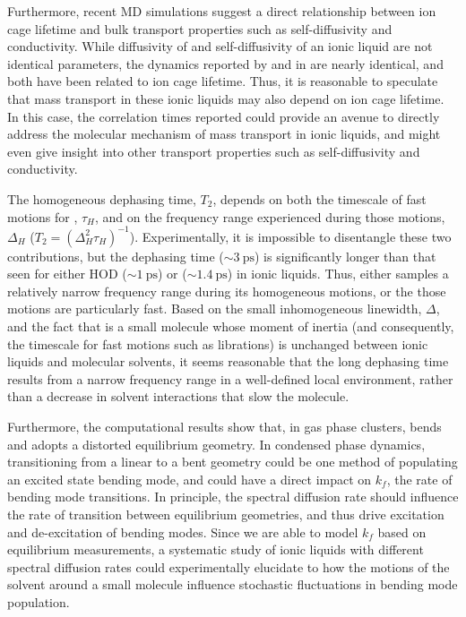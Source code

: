 \documentclass[%
  class = book,%
  crop = false,%
  float = true,%
  multi = true,%
  preview = false,%
]{standalone}
\let\cite\autocite
\begin{document}
{Furthermore, recent MD simulations suggest a direct relationship between ion cage lifetime and bulk transport properties such as self-diffusivity and conductivity.\cite{Zhang2015b} While diffusivity of  and self-diffusivity of an ionic liquid are not identical parameters, the dynamics reported by  and \ce{[SCN]-}\cite{Ren2014} in \ce{[Im_{4,1}][Tf2N]} are nearly identical, and both have been related to ion cage lifetime. Thus, it is reasonable to speculate that  mass transport in these ionic liquids may also depend on ion cage lifetime. In this case, the correlation times reported could provide an avenue to directly address the molecular mechanism of  mass transport in ionic liquids, and might even give insight into other transport properties such as self-diffusivity and conductivity.

The homogeneous dephasing time, \(T_2\), depends on both the timescale of fast motions for , \(\tau_H\), and on the frequency range experienced during those motions, \(\Delta_H\) (\(T_{2} = \left( {\Delta}_H^{2}\tau_H \right)^{-1}\)). Experimentally, it is impossible to disentangle these two contributions, but the dephasing time (\(\sim \SI{3}{\ps}\)) is significantly longer than that seen for either HOD (\(\sim \SI{1}{\ps}\)) or  (\(\sim \SI{1.4}{\ps}\)) in ionic liquids. Thus, either  samples a relatively narrow frequency range during its homogeneous motions, or the those motions are particularly fast. Based on the small inhomogeneous linewidth, \(\Delta\), and the fact that  is a small molecule whose moment of inertia (and consequently, the timescale for fast motions such as librations) is unchanged between ionic liquids and molecular solvents, it seems reasonable that the long dephasing time results from a narrow frequency range in a well-defined local environment, rather than a decrease in solvent interactions that slow the molecule.

Furthermore, the computational results show that, in gas phase clusters,  bends and adopts a distorted equilibrium geometry. In condensed phase dynamics, transitioning from a linear to a bent geometry could be one method of populating an excited state bending mode, and could have a direct impact on \(k_f\), the rate of bending mode transitions. In principle, the spectral diffusion rate should influence the rate of transition between equilibrium geometries, and thus drive excitation and de-excitation of bending modes. Since we are able to model \(k_f\) based on equilibrium measurements, a systematic study of ionic liquids with different spectral diffusion rates could experimentally elucidate to how the motions of the solvent around a small molecule influence stochastic fluctuations in bending mode population.

}
\end{document}
